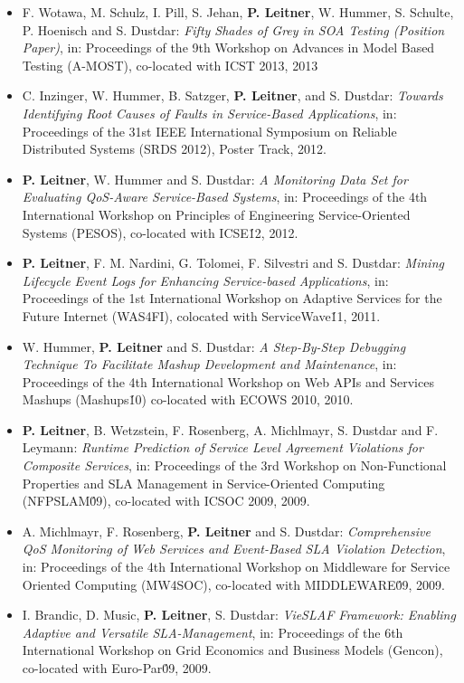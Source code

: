 \documentclass[paper=letter,fontsize=11pt]{scrartcl} %
\begin{document}
\begin{itemize}
\item F. Wotawa, M. Schulz, I. Pill, S. Jehan, \textbf{P. Leitner}, W. Hummer, S. Schulte, P. Hoenisch and S. Dustdar: \emph{Fifty Shades of Grey in SOA Testing (Position Paper)}, in: Proceedings of the 9th Workshop on Advances in Model Based Testing (A-MOST), co-located with ICST 2013, 2013
\item C. Inzinger, W. Hummer, B. Satzger, \textbf{P. Leitner}, and S. Dustdar:
\emph{Towards Identifying Root Causes of Faults in Service-Based Applications}, in: Proceedings of the 31st IEEE International Symposium on Reliable Distributed Systems (SRDS 2012), Poster Track, 2012. 
\item \textbf{P. Leitner}, W. Hummer and S. Dustdar:
\emph{A Monitoring Data Set for Evaluating QoS-Aware Service-Based Systems}, in: Proceedings of the 4th International Workshop on Principles of Engineering Service-Oriented Systems (PESOS), co-located with ICSE\'12, 2012. 
\item \textbf{P. Leitner}, F. M. Nardini, G. Tolomei, F. Silvestri
and S. Dustdar: \emph{Mining Lifecycle Event Logs for Enhancing
Service-based Applications}, in: Proceedings of the 1st International Workshop on Adaptive Services
for the Future Internet (WAS4FI), colocated with ServiceWave\'11, 2011. 
\item W. Hummer, \textbf{P. Leitner} and S. Dustdar: \emph{A Step-By-Step Debugging Technique To Facilitate Mashup Development and Maintenance}, in: Proceedings of the 4th International Workshop on Web APIs and Services Mashups (Mashups\'10) co-located with ECOWS 2010, 2010. 
\item \textbf{P. Leitner}, B. Wetzstein, F. Rosenberg, A. Michlmayr, S. Dustdar and F. Leymann: \emph{Runtime Prediction of Service Level Agreement Violations for Composite Services}, in: Proceedings of the 3rd Workshop on Non-Functional Properties and SLA Management in Service-Oriented Computing (NFPSLAM\'09), co-located with ICSOC 2009, 2009. 
\item A. Michlmayr, F. Rosenberg, \textbf{P. Leitner} and S. Dustdar: \emph{Comprehensive QoS Monitoring of Web Services and Event-Based SLA Violation Detection}, in: Proceedings of the 4th International Workshop on Middleware for Service Oriented Computing (MW4SOC), co-located with MIDDLEWARE\'09, 2009. 
\item I. Brandic, D. Music, \textbf{P. Leitner}, S. Dustdar: \emph{VieSLAF Framework: Enabling Adaptive and Versatile SLA-Management}, in: Proceedings of the 6th International Workshop on Grid Economics and Business Models (Gencon), co-located with Euro-Par\'09, 2009. 

\end{itemize}
\end{document}

